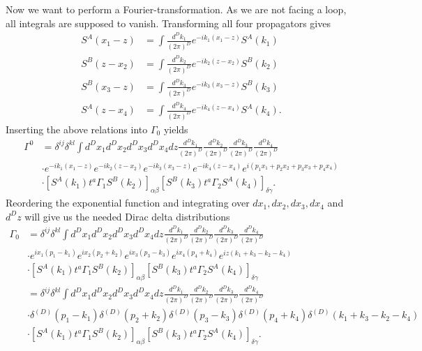 	Now we want to perform a Fourier-transformation. As we are not facing a loop, all integrals are supposed to vanish. Transforming all four propagators gives
	\begin{equation}
		\begin{split}
			S^A(x_1-z) &= \int \frac{d^Dk_1}{(2\pi)^D} e^{-ik_1(x_1-z)} S^A(k_1) \\
			S^B(z-x_2) &= \int \frac{d^Dk_2}{(2\pi)^D} e^{-ik_2(z-x_2)} S^B(k_2) \\
			S^B(x_3-z) &= \int \frac{d^Dk_3}{(2\pi)^D} e^{-ik_3(x_3-z)} S^B(k_3) \\
			S^A(z-x_4) &= \int \frac{d^Dk_4}{(2\pi)^D} e^{-ik_4(z-x_4)} S^A(k_4). 
		\end{split}
	\end{equation}
	Inserting the above relations into $\Gamma_0$ yields
	\begin{equation}
		\begin{split}
			\Gamma^0
			 &= \delta^{ij}\delta^{kl} \int d^D x_1 d^D x_2 d^D x_3 d^D x_4 dz \frac{d^D k_1}{(2\pi)^D} \frac{d^D k_2}{(2\pi)^D} \frac{d^D k_3}{(2\pi)^D} \frac{d^D k_4}{(2\pi)^D} \\
			&\cdot e^{-ik_1(x_1-z)} e^{-ik_2(z-x_2)}e^{-ik_3(x_3-z)}e^{-ik_4(z-x_4)} e^{i(p_1x_1 + p_2x_2 + p_3x_3 + p_4x_4)} \\ 
			&\cdot [S^A(k_1) t^a\Gamma_1 S^B(k_2) ]_{\alpha\beta} [S^B(k_3)t^a\Gamma_2S^A(k_4)]_{\delta\gamma}.
		\end{split}
	\end{equation}
	Reordering the exponential function and integrating over $dx_1, dx_2, dx_3, dx_4$ and $d^Dz$ will give us the needed Dirac delta distributions
	\begin{equation}
		\begin{split}
			\Gamma_0 &= \delta^{ij}\delta^{kl} \int d^D x_1 d^D x_2 d^D x_3 d^D x_4 dz \frac{d^D k_1}{(2\pi)^D} \frac{d^D k_2}{(2\pi)^D} \frac{d^D k_3}{(2\pi)^D} \frac{d^D k_4}{(2\pi)^D} \\
			&\cdot e^{ix_1(p_1-k_1)} e^{ix_2(p_2+k_2)} e^{ix_3(p_3-k_3)} e^{ix_4(p_4+k_4)} e^{iz(k_1+k_3-k_2-k_4)} \\
			&\cdot [S^A(k_1) t^a\Gamma_1 S^B(k_2) ]_{\alpha\beta} [S^B(k_3)t^a\Gamma_2S^A(k_4)]_{\delta\gamma} \\
			 &= \delta^{ij}\delta^{kl} \int d^D x_1 d^D x_2 d^D x_3 d^D x_4 dz \frac{d^D k_1}{(2\pi)^D} \frac{d^D k_2}{(2\pi)^D} \frac{d^D k_3}{(2\pi)^D} \frac{d^D k_4}{(2\pi)^D} \\
			&\cdot \delta^{(D)}(p_1-k_1) \delta^{(D)}(p_2+k_2) \delta^{(D)}(p_3-k_3) \delta^{(D)}(p_4+k_4) \delta^{(D)}(k_1+k_3-k_2-k_4) \\
			&\cdot [S^A(k_1) t^a\Gamma_1 S^B(k_2) ]_{\alpha\beta} [S^B(k_3)t^a\Gamma_2S^A(k_4)]_{\delta\gamma}.
		\end{split}
	\end{equation}
